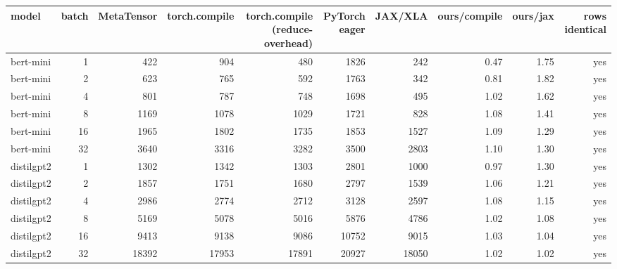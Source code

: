 \begin{tabular}{lrrrrrrrrr}
\toprule
model & batch & MetaTensor & torch.compile & torch.compile (reduce-overhead) & PyTorch eager & JAX/XLA & ours/compile & ours/jax & rows identical \\
\midrule
bert-mini & 1 & 422 & 904 & 480 & 1826 & 242 & 0.47 & 1.75 & yes \\
bert-mini & 2 & 623 & 765 & 592 & 1763 & 342 & 0.81 & 1.82 & yes \\
bert-mini & 4 & 801 & 787 & 748 & 1698 & 495 & 1.02 & 1.62 & yes \\
bert-mini & 8 & 1169 & 1078 & 1029 & 1721 & 828 & 1.08 & 1.41 & yes \\
bert-mini & 16 & 1965 & 1802 & 1735 & 1853 & 1527 & 1.09 & 1.29 & yes \\
bert-mini & 32 & 3640 & 3316 & 3282 & 3500 & 2803 & 1.10 & 1.30 & yes \\
distilgpt2 & 1 & 1302 & 1342 & 1303 & 2801 & 1000 & 0.97 & 1.30 & yes \\
distilgpt2 & 2 & 1857 & 1751 & 1680 & 2797 & 1539 & 1.06 & 1.21 & yes \\
distilgpt2 & 4 & 2986 & 2774 & 2712 & 3128 & 2597 & 1.08 & 1.15 & yes \\
distilgpt2 & 8 & 5169 & 5078 & 5016 & 5876 & 4786 & 1.02 & 1.08 & yes \\
distilgpt2 & 16 & 9413 & 9138 & 9086 & 10752 & 9015 & 1.03 & 1.04 & yes \\
distilgpt2 & 32 & 18392 & 17953 & 17891 & 20927 & 18050 & 1.02 & 1.02 & yes \\
\bottomrule
\end{tabular}
